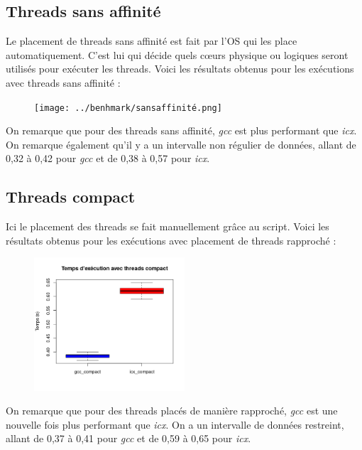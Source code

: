 \documentclass{rapport}
\begin{document}
        \subsection{Threads sans affinité}
        Le placement de threads sans affinité est fait par l'OS qui les place automatiquement. C'est lui qui décide quels cœurs physique ou logiques seront utilisés pour exécuter les threads.
            Voici les résultats obtenus pour les exécutions avec threads sans affinité : 

            \begin{figure}[H]
                \centering
                \texttt{[image: ../benhmark/sansaffinité.png]}
            \end{figure}
                
            On remarque que pour des threads sans affinité, \textit{gcc} est plus performant que \textit{icx}. On remarque également qu'il y a un intervalle non régulier de données, allant de 0,32 à 0,42 pour \textit{gcc} et de 0,38 à 0,57 pour \textit{icx}.
        \subsection{Threads compact}
        Ici le placement des threads se fait manuellement grâce au script.
        \newline
            Voici les résultats obtenus pour les exécutions avec placement de threads rapproché :

            \begin{figure}[H]
                \centering
                \includegraphics[width=0.5\textwidth]{../benhmark/compact.png}
            \end{figure}

            On remarque que pour des threads placés de manière rapproché, \textit{gcc} est une nouvelle fois plus performant que \textit{icx}. On a un intervalle de données restreint, allant de 0,37 à 0,41 pour \textit{gcc} et de 0,59 à 0,65 pour \textit{icx}.
\end{document}
